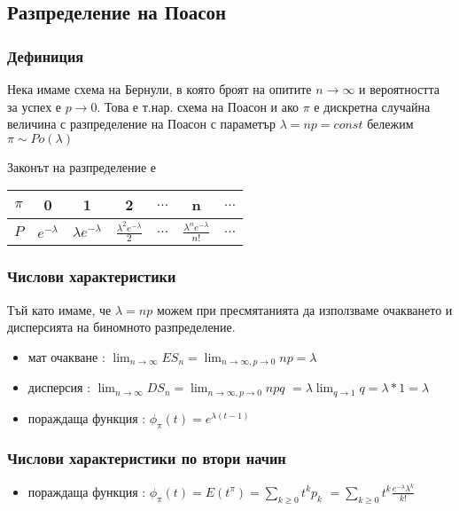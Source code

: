 \documentclass[fleqn,12pt]{article}
\begin{document}
\begin{justify}
\subsection{Разпределение на Поасон}
\subsubsection{Дефиниция}
Нека имаме схема на Бернули, в която броят на опитите $n \rightarrow \infty$ и вероятността за успех е 
$p \rightarrow 0$. Това е т.нар. схема на Поасон и ако $\pi$ е дискретна случайна величина с разпределение на 
Поасон с параметър $\lambda = n p = const$ бележим $\pi \sim Po(\lambda)$

Законът на разпределение е

\begin{tabular}{|c|c|c|c|c|c|c|}
    \hline
    $\pi$ & 0 & 1 & 2 & $\dots$ & n & $\dots$ \\
    \hline
    $P$ & $e^{-\lambda}$ & $\lambda e^{-\lambda}$ & $\frac{\lambda^2 e^{-\lambda}}{2}$ & $\dots$ & $\frac{\lambda^n
    e^{-\lambda}}{n!}$& $\dots$ \\
    \hline
\end{tabular}

\subsubsection{Числови характеристики} 
Тъй като имаме, че $\lambda = n p$ можем при пресмятанията да използваме очакването и дисперсията на биномното 
разпределение. 
\begin{itemize}
    \item мат очакване : $\lim_{n \rightarrow \infty} ES_n = \lim_{n \rightarrow \infty, p \rightarrow 0} np = \lambda$
    \item дисперсия : $\lim_{n \rightarrow \infty} DS_n = \lim_{n \rightarrow \infty, p \rightarrow 0} npq$
     $ = \lambda \lim_{q \rightarrow 1} q = \lambda * 1 = \lambda$
    \item пораждаща функция : $\phi_\pi(t) = e^{\lambda(t-1)}$
\end{itemize}
\subsubsection{Числови характеристики по втори начин}
\begin{itemize}
    \item пораждаща функция : $\phi_\pi(t) = E(t^\pi) = \sum_{k \geq 0} t^{k}p_k$
    $= \sum_{k \geq 0} t^{k} \frac{e^{-\lambda}\lambda^k}{k!} $


\end{itemize}
\end{justify}
\end{document}
